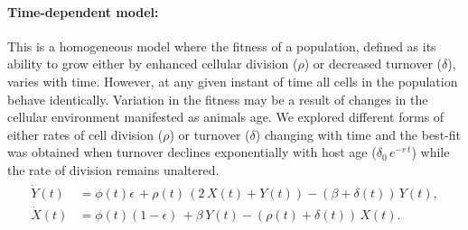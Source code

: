 \documentclass[11pt]{article}
\newcommand{\bea}{\begin{eqnarray}}
\newcommand{\eea}{\end{eqnarray}}
\begin{document}
\paragraph*{Time-dependent model:} 
This is a homogeneous model where the fitness of a population, defined as its ability to grow either by enhanced cellular division ($\rho$) or decreased turnover ($\delta$), varies with time.
However, at any given instant of time all cells in the population behave identically. %
Variation in the fitness may be a result of changes in the cellular environment manifested as animals age.
We explored different forms of either rates of cell division ($\rho$) or turnover ($\delta$) changing with time and the best-fit was obtained when turnover declines exponentially with host age ($\delta_0 \, e^{-r\,t}$) while the rate of division remains unaltered.
\bea
\begin{aligned}
	\dot Y(t) &= \phi(t) \epsilon \, + \rho(t) \,(2 \,  X(t) + Y(t)) - (\beta + \delta(t)) \, Y(t),\\
	\dot X(t) &= \phi(t) (1-\epsilon) \, + \beta  \, Y(t) - (\rho(t) + \delta(t)) \, X(t).
	\label{eq:TDM}
\end{aligned}
\eea
\end{document}
